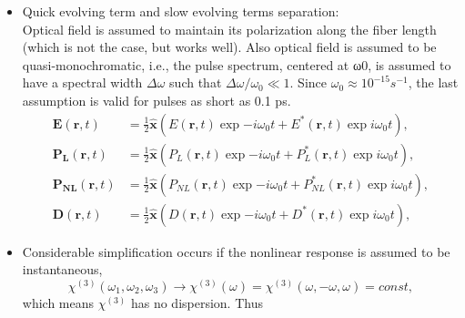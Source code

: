 \documentclass[12pt]{extarticle}
\numberwithin{equation}{section}
\numberwithin{figure}{section}
\numberwithin{table}{section}
\newcommand{\<}{\langle}
\renewcommand{\>}{\rangle}
\theoremstyle{definition}
\begin{document}
\begin{itemize}
                
            \item Quick evolving term and slow evolving terms separation:\\
                Optical field is assumed to maintain its polarization along the fiber length (which is not the case, but works well). Also optical field is assumed to be quasi-monochromatic, i.e., the pulse spectrum, centered at ω0, is assumed to have a spectral width $\Delta \omega$ such that $\Delta \omega/\omega_0 \ll 1$. Since $\omega_0\approx10^{-15}s^{-1}$, the last assumption is valid for pulses as short as 0.1 ps.
                \begin{subequations}
                \label{fast oscillation separation}
                    \begin{align}
                        \boldsymbol{E}(\boldsymbol{r},t)&=\frac{1}{2}\hat{\boldsymbol{x}}(E(\boldsymbol{r},t)\exp{-i\omega_0 t}+E^{*}(\boldsymbol{r},t)\exp{i\omega_0 t}),\label{fast oscillation separation: E}\\
                        \boldsymbol{P_L}(\boldsymbol{r},t)&=\frac{1}{2}\hat{\boldsymbol{x}}(P_L(\boldsymbol{r},t)\exp{-i\omega_0 t}+P_L^{*}(\boldsymbol{r},t)\exp{i\omega_0 t}),\label{fast oscillation separation: P}\\
                        \boldsymbol{P_{NL}}(\boldsymbol{r},t)&=\frac{1}{2}\hat{\boldsymbol{x}}(P_{NL}(\boldsymbol{r},t)\exp{-i\omega_0 t}+P_{NL}^{*}(\boldsymbol{r},t)\exp{i\omega_0 t}),\label{fast oscillation separation: PNL}\\
                        \boldsymbol{D}(\boldsymbol{r},t)&=\frac{1}{2}\hat{\boldsymbol{x}}(D(\boldsymbol{r},t)\exp{-i\omega_0 t}+D^{*}(\boldsymbol{r},t)\exp{i\omega_0 t}),\label{fast oscillation separation: D}
                    \end{align}
                \end{subequations}
            \item Considerable simplification occurs if the nonlinear response is assumed to be instantaneous,
            \begin{equation}
                \chi^{(3)}(\omega_1,\omega_2,\omega_3)\longrightarrow\chi^{(3)}(\omega)=\chi^{(3)}(\omega,-\omega,\omega)=const,
                \label{chi3 has no dispersion, instantaneous response}
            \end{equation}
            which means $\chi^{(3)}$ has no dispersion. Thus
                \begin{equation}
                    \label{PNL with EEE relation}

\end{equation}
\end{itemize}
\end{document}
